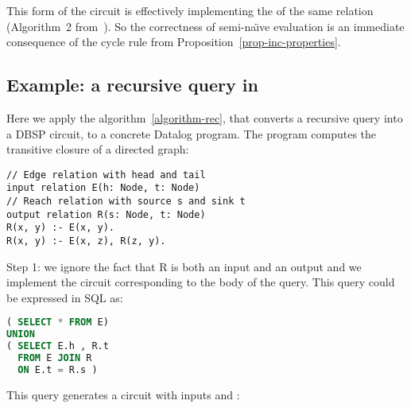 This form of the circuit is effectively implementing the 
of the same relation (Algorithm~2 from~\cite{greco-sldm15}).  So the correctness of semi-na\"{\i}ve evaluation
is an immediate consequence of the cycle rule from Proposition~\ref{prop-inc-properties}.

\begin{comment}
Let us notice that the combination $\int \circ \D$ applied to a
monotone stream will produce that fixed-point value of the input
stream (if it exists).  This suggests a simple practical implementation
for for $\int$ operator: stop aggregating at the first input that is 0.
For monotone loop bodies involving a positive query $Q$ this implementation is
correct.
\end{comment}

\subsection{Example: a recursive query in \dbsp}\label{sec:recursive-example}

Here we apply the algorithm~\ref{algorithm-rec}, that converts a
recursive query into a DBSP circuit, to a concrete Datalog program.
The program computes the transitive closure of a directed graph:

\begin{lstlisting}[language=ddlog,basicstyle=\small]
// Edge relation with head and tail
input relation E(h: Node, t: Node)
// Reach relation with source s and sink t
output relation R(s: Node, t: Node)
R(x, y) :- E(x, y).
R(x, y) :- E(x, z), R(z, y).
\end{lstlisting}

Step 1: we ignore the fact that R is both an input and an output and we implement
the \dbsp circuit corresponding to the body of the query.  This query could be expressed
in SQL as:

\begin{lstlisting}[language=SQL,basicstyle=\small]
( SELECT * FROM E)
UNION
( SELECT E.h , R.t
  FROM E JOIN R
  ON E.t = R.s )
\end{lstlisting}

This query generates a \dbsp circuit with inputs  and :


